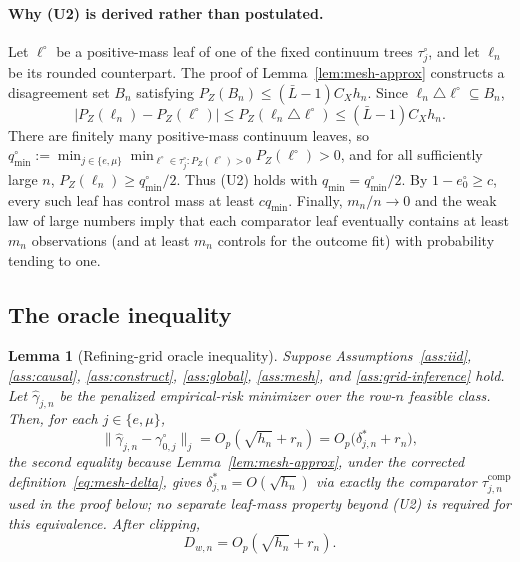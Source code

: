 \documentclass[11pt]{article}
\theoremstyle{plain}
\newtheorem{lemma}[theorem]{Lemma}
\theoremstyle{definition}
\theoremstyle{remark}
\newcommand{\ez}{e_0}
\begin{document}
\paragraph{Why (U2) is derived rather than postulated.} Let $\ell^\circ$ be
a positive-mass leaf of one of the fixed continuum trees $\tau_j^\circ$, and
let $\ell_n$ be its rounded counterpart. The proof of
Lemma~\ref{lem:mesh-approx} constructs a disagreement set $B_n$ satisfying
$P_Z(B_n)\le(\bar L-1)C_Xh_n$. Since $\ell_n\triangle\ell^\circ\subseteq
B_n$,
\[
  |P_Z(\ell_n)-P_Z(\ell^\circ)|
  \le P_Z(\ell_n\triangle\ell^\circ)
  \le(\bar L-1)C_Xh_n.
\]
There are finitely many positive-mass continuum leaves, so
$q^\circ_{\min}:=\min_{j\in\{e,\mu\}}\min_{\ell^\circ\in\tau_j^\circ:
P_Z(\ell^\circ)>0}P_Z(\ell^\circ)>0$, and for all sufficiently large $n$,
$P_Z(\ell_n)\ge q^\circ_{\min}/2$. Thus (U2) holds with
$q_{\min}=q^\circ_{\min}/2$. By $1-\ez^\circ\ge c$, every such leaf has
control mass at least $cq_{\min}$. Finally, $m_n/n\to0$ and the weak law of
large numbers imply that each comparator leaf eventually contains at least
$m_n$ observations (and at least $m_n$ controls for the outcome fit) with
probability tending to one.

\subsection{The oracle inequality}\label{sec:grid-oracle}

\begin{lemma}[Refining-grid oracle inequality]
\label{lem:grid-oracle}
Suppose Assumptions~\ref{ass:iid}, \ref{ass:causal},
\ref{ass:construct}, \ref{ass:global}, \ref{ass:mesh}, and
\ref{ass:grid-inference} hold. Let $\widehat\gamma_{j,n}$ be the penalized
empirical-risk minimizer over the row-$n$ feasible class. Then, for each
$j\in\{e,\mu\}$,
\begin{equation}\label{eq:grid-oracle}
  \|\widehat\gamma_{j,n}-\gamma_{0,j}^\circ\|_j
  =O_p\!\left(\sqrt{h_n}+r_n\right)
  =O_p\bigl(\delta^*_{j,n}+r_n\bigr),
\end{equation}
the second equality because Lemma~\ref{lem:mesh-approx}, under the
corrected definition~\eqref{eq:mesh-delta}, gives $\delta^*_{j,n}=O(\sqrt{h_n})$
via exactly the comparator $\tau^{\mathrm{comp}}_{j,n}$ used in the proof
below; no separate leaf-mass property beyond (U2) is required for this
equivalence. After clipping,
\begin{equation}\label{eq:grid-weight-oracle}
  D_{w,n}=O_p(\sqrt{h_n}+r_n).
\end{equation}
\end{lemma}
\end{document}

